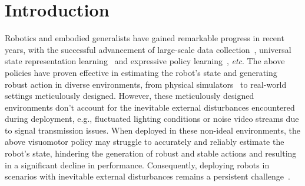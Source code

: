 \section{Introduction}



Robotics and embodied generalists have gained remarkable progress in recent years, with the successful advancement of large-scale data collection~\citep{vuong2023open}, universal state representation learning~\citep{li2023vision,du2024learning} and expressive policy learning~\citep{brohan2022rt,chi2023diffusion}, \textit{etc}. 
%
The above policies have proven effective in estimating the robot’s state and generating robust action in diverse environments, from physical simulators~\citep{mu2021maniskill,ding2023quar} to real-world settings meticulously designed.
% 
However, these meticulously designed environments don't account for the inevitable external disturbances encountered during deployment, e.g., fluctuated lighting conditions or noise video streams due to signal transmission issues.
%
When deployed in these non-ideal environments, the above visuomotor policy may struggle to accurately and reliably estimate the robot’s state, hindering the generation of robust and stable actions and resulting in a significant decline in performance.
% 
Consequently, deploying robots in scenarios with inevitable external disturbances remains a persistent challenge~\citep{}.


